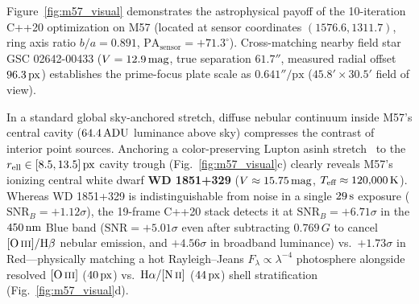 \documentclass[10pt,twocolumn,letterpaper]{article}
\DeclareRobustCommand{\code}[1]{\texttt{#1}}
\def\code#1{#1}%
\begin{document}
Figure~\ref{fig:m57_visual} demonstrates the astrophysical payoff of the 10-iteration C++20 optimization on M57 (located at sensor coordinates $(1576.6, 1311.7)$, ring axis ratio $b/a = 0.891$, $\text{PA}_{\text{sensor}} = +71.3^\circ$). Cross-matching nearby field star \code{GSC 02642-00433} ($V = 12.9\text{\,mag}$, true separation $61.7''$, measured radial offset $96.3\text{\,px}$) establishes the prime-focus plate scale as $0.641''/\text{px}$ ($45.8' \times 30.5'$ field of view).

In a standard global sky-anchored stretch, diffuse nebular continuum inside M57's central cavity ($64.4\text{\,ADU}$ luminance above sky) compresses the contrast of interior point sources. Anchoring a color-preserving Lupton \code{asinh} stretch~\cite{lupton2004preparing} to the $r_{\text{ell}} \in [8.5, 13.5]\text{\,px}$ cavity trough (Fig.~\ref{fig:m57_visual}c) clearly reveals M57's ionizing central white dwarf \textbf{\code{WD 1851+329}} ($V \approx 15.75\text{\,mag}$, $T_{\text{eff}} \approx 120{,}000\text{\,K}$). Whereas \code{WD 1851+329} is indistinguishable from noise in a single $29\text{\,s}$ exposure ($\text{SNR}_B = +1.12\sigma$), the 19-frame C++20 stack detects it at \textbf{$\text{SNR}_B = +6.71\sigma$} in the $450\text{\,nm}$ Blue band ($\text{SNR} = +5.01\sigma$ even after subtracting $0.769\,G$ to cancel $[\text{O\,\textsc{iii}}]/\text{H}\beta$ nebular emission, and $+4.56\sigma$ in broadband luminance) vs.\ $+1.73\sigma$ in Red---physically matching a hot Rayleigh--Jeans $F_\lambda \propto \lambda^{-4}$ photosphere alongside resolved $[\text{O\,\textsc{iii}}]$ ($40\text{\,px}$) vs.\ $\text{H}\alpha/[\text{N\,\textsc{ii}}]$ ($44\text{\,px}$) shell stratification (Fig.~\ref{fig:m57_visual}d).
\end{document}

